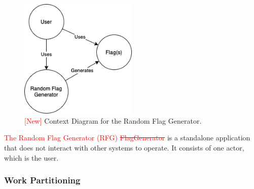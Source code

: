 \documentclass[12pt, titlepage]{article}
\begin{document}
\begin{figure}[h!]
    \centering
    \includegraphics[width=0.5\textwidth]{FRs_WorkContext_New.png}
    \caption{\textcolor{red}{[New]} Context Diagram for the Random Flag Generator.}
    \label{fig:FRs_WC_N}
\end{figure}

\noindent \textcolor{red}{The Random Flag Generator (RFG) \sout{FlagGenerator}} is a standalone application that does not interact with other systems to operate. It consists of one actor, which is the user.


\subsubsection{Work Partitioning}
\end{document}
